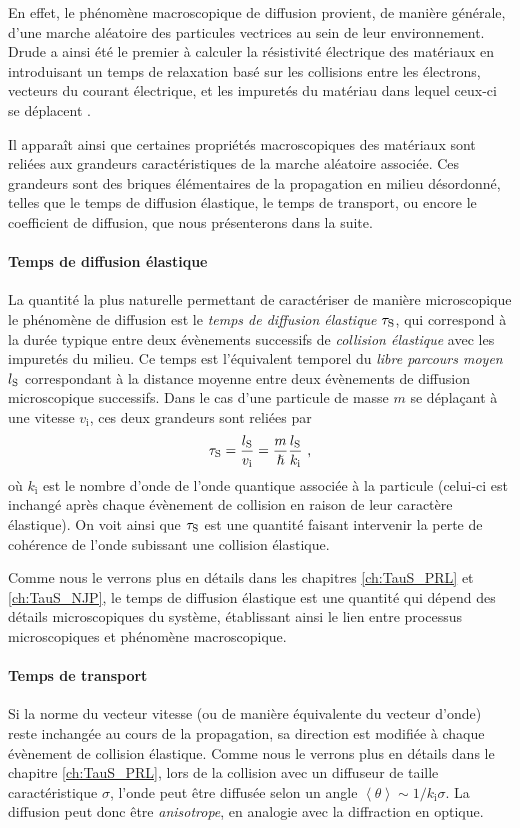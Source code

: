 En effet, le phénomène macroscopique de diffusion provient, de manière générale, d'une marche aléatoire des particules vectrices au sein de leur environnement. Drude a ainsi été le premier à calculer la résistivité électrique des matériaux en introduisant un temps de relaxation basé sur les collisions entre les électrons, vecteurs du courant électrique, et les impuretés du matériau dans lequel ceux-ci se déplacent \citep{ashcroft2010solid}. 

Il apparaît ainsi que certaines propriétés macroscopiques des matériaux sont reliées aux grandeurs caractéristiques de la marche aléatoire associée. Ces grandeurs sont des briques élémentaires de la propagation en milieu désordonné, telles que le temps de diffusion élastique, le temps de transport, ou encore le coefficient de diffusion, que nous présenterons dans la suite.

\paragraph*{Temps de diffusion élastique}
La quantité la plus naturelle permettant de caractériser de manière microscopique le phénomène de diffusion est le \emph{temps de diffusion élastique} $\tau_{\mathrm{S}}$, qui correspond à la durée typique entre deux évènements successifs de \emph{collision élastique} avec les impuretés du milieu. Ce temps est l'équivalent temporel du \emph{libre parcours moyen}  $l_{\mathrm{S}}$ correspondant à la distance moyenne entre deux évènements de diffusion microscopique successifs. Dans le cas d'une particule de masse $m$ se déplaçant à une vitesse $v_{\mathrm{i}}$, ces deux grandeurs sont reliées par
\begin{equation}
\tau_{\mathrm{S}}=\frac{l_{\mathrm{S}}}{v_{\mathrm{i}}}=\frac{m}{\hslash} \frac{l_{\mathrm{S}}}{k_{\mathrm{i}}} \text{ ,}
\label{eq:definition_taus}
\end{equation}
où $k_{\mathrm{i}}$ est le nombre d'onde de l'onde quantique associée à la particule (celui-ci est inchangé après chaque évènement de collision en raison de leur caractère élastique). On voit ainsi que $\tau_{\mathrm{S}}$ est une quantité faisant intervenir la perte de cohérence de l'onde subissant une collision élastique.

Comme nous le verrons plus en détails dans les chapitres \ref{ch:TauS_PRL} et \ref{ch:TauS_NJP}, le temps de diffusion élastique est une quantité qui dépend des détails microscopiques du système, établissant ainsi le lien entre processus microscopiques et phénomène macroscopique.


\paragraph*{Temps de transport}
Si la norme du vecteur vitesse (ou de manière équivalente du vecteur d'onde) reste inchangée au cours de la propagation, sa direction est modifiée à chaque évènement de collision élastique. Comme nous le verrons plus en détails dans le chapitre \ref{ch:TauS_PRL}, lors de la collision avec un diffuseur de taille caractéristique $\sigma$, l'onde peut être diffusée selon un angle $\left\langle\theta\right\rangle\sim 1/k_{\mathrm{i}} \sigma$. La diffusion peut donc être \emph{anisotrope}, en analogie avec la diffraction en optique.


